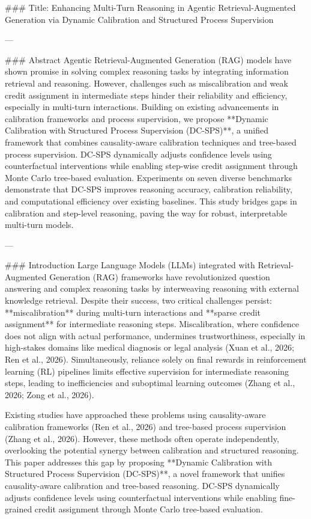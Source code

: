 ### Title: Enhancing Multi-Turn Reasoning in Agentic Retrieval-Augmented Generation via Dynamic Calibration and Structured Process Supervision

---

### Abstract
Agentic Retrieval-Augmented Generation (RAG) models have shown promise in solving complex reasoning tasks by integrating information retrieval and reasoning. However, challenges such as miscalibration and weak credit assignment in intermediate steps hinder their reliability and efficiency, especially in multi-turn interactions. Building on existing advancements in calibration frameworks and process supervision, we propose **Dynamic Calibration with Structured Process Supervision (DC-SPS)**, a unified framework that combines causality-aware calibration techniques and tree-based process supervision. DC-SPS dynamically adjusts confidence levels using counterfactual interventions while enabling step-wise credit assignment through Monte Carlo tree-based evaluation. Experiments on seven diverse benchmarks demonstrate that DC-SPS improves reasoning accuracy, calibration reliability, and computational efficiency over existing baselines. This study bridges gaps in calibration and step-level reasoning, paving the way for robust, interpretable multi-turn models.

---

### Introduction
Large Language Models (LLMs) integrated with Retrieval-Augmented Generation (RAG) frameworks have revolutionized question answering and complex reasoning tasks by interweaving reasoning with external knowledge retrieval. Despite their success, two critical challenges persist: **miscalibration** during multi-turn interactions and **sparse credit assignment** for intermediate reasoning steps. Miscalibration, where confidence does not align with actual performance, undermines trustworthiness, especially in high-stakes domains like medical diagnosis or legal analysis (Xuan et al., 2026; Ren et al., 2026). Simultaneously, reliance solely on final rewards in reinforcement learning (RL) pipelines limits effective supervision for intermediate reasoning steps, leading to inefficiencies and suboptimal learning outcomes (Zhang et al., 2026; Zong et al., 2026).

Existing studies have approached these problems using causality-aware calibration frameworks (Ren et al., 2026) and tree-based process supervision (Zhang et al., 2026). However, these methods often operate independently, overlooking the potential synergy between calibration and structured reasoning. This paper addresses this gap by proposing **Dynamic Calibration with Structured Process Supervision (DC-SPS)**, a novel framework that unifies causality-aware calibration and tree-based reasoning. DC-SPS dynamically adjusts confidence levels using counterfactual interventions while enabling fine-grained credit assignment through Monte Carlo tree-based evaluation.


